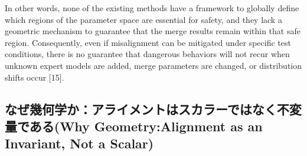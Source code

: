 \documentclass{article}
\begin{document}
In other words, none of the existing methods have a framework to globally define which regions of the parameter space are essential for safety, and they lack a geometric mechanism to guarantee that the merge results remain within that safe region. Consequently, even if misalignment can be mitigated under specific test conditions, there is no guarantee that dangerous behaviors will not recur when unknown expert models are added, merge parameters are changed, or distribution shifts occur [15].

\subsection{なぜ幾何学か：アライメントはスカラーではなく不変量である(Why Geometry:Alignment as an Invariant, Not a Scalar)}



\end{document}
